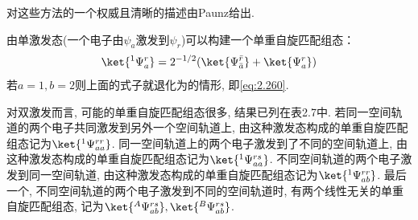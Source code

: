 对这些方法的一个权威且清晰的描述由Paunz给出.


由单激发态(一个电子由$\psi_a$激发到$\psi_r$)可以构建一个单重自旋匹配组态：
\begin{align}
\ket{^1\Psi_a^r} = 2^{-1/2}(\ket{\Psi_{\bar{a}}^{\bar{r}}} + \ket{\Psi_a^r})
\end{align}
若$a=1,b=2$则上面的式子就退化为的情形, 
即\autoref{eq:2.260}.


对双激发而言, 
可能的单重自旋匹配组态很多, 
结果已列在表2.7中. 
若同一空间轨道的两个电子共同激发到另外一个空间轨道上, 
由这种激发态构成的单重自旋匹配组态记为$\ket{^1\Psi_{aa}^{rr}}$. 
同一空间轨道上的两个电子激发到了不同的空间轨道上, 
由这种激发态构成的单重自旋匹配组态记为$\ket{^1\Psi_{aa}^{rs}}$. 
不同空间轨道的两个电子激发到同一空间轨道, 
由这种激发态构成的单重自旋匹配组态记为$\ket{^1\Psi_{ab}^{rr}}$. 
最后一个, 
不同空间轨道的两个电子激发到不同的空间轨道时, 
有两个线性无关的单重自旋匹配组态, 
记为$\ket{^A\Psi_{ab}^{rs}}, \ket{^B\Psi_{ab}^{rs}}$.


